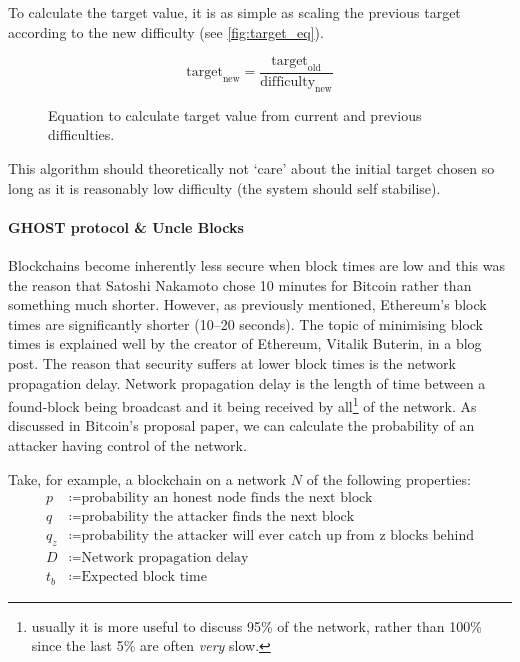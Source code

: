\documentclass{article}
\begin{document}
To calculate the target value, it is as simple as scaling the previous target according to the new difficulty (see \autoref{fig:target_eq}).
\begin{figure}[h]
    \[\textrm{target}_{\textrm{new}} = \frac{\textrm{target}_{\textrm{old}}} {\textrm{difficulty}_{\textrm{new}}}\]
    \caption{Equation to calculate target value from current and previous difficulties.}
    \label{fig:target_eq}
\end{figure}
This algorithm should theoretically not `care' about the initial target chosen so long as it is reasonably low difficulty (the system should self stabilise). 





\paragraph{GHOST protocol \& Uncle Blocks}\label{para:ghostprotocol}
Blockchains become inherently less secure when block times are low and this was the reason that Satoshi Nakamoto chose 10 minutes for Bitcoin rather than something much shorter. However, as previously mentioned, Ethereum's block times are significantly shorter (10--20 seconds). The topic of minimising block times is explained well by the creator of Ethereum, Vitalik Buterin, in a blog post\cite{toward_twelve_s_bt}. The reason that security suffers at lower block times is the network propagation delay. Network propagation delay is the length of time between a found-block being broadcast and it being received by all\footnote{usually it is more useful to discuss 95\% of the network, rather than 100\% since the last 5\% are often \emph{very} slow.} of the network. As discussed in Bitcoin's proposal paper\cite{bitcoin_paper}, we can calculate the probability of an attacker having control of the network.

Take, for example, a blockchain on a network $N$ of the following properties:
\begin{align*}
    p &\coloneqq \textrm{probability an honest node finds the next block} \\
    q &\coloneqq \textrm{probability the attacker finds the next block} \\
    q_{z} &\coloneqq \textrm{probability the attacker will ever catch up from z blocks behind} \\
    D &\coloneqq \textrm{Network propagation delay} \\
    t_b &\coloneqq \textrm{Expected block time}
\end{align*}
\end{document}
